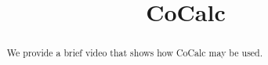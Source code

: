 \documentclass{ximera}
\title{CoCalc}
\begin{document}
  
\begin{abstract}  
We provide a brief video that shows how CoCalc may be used.
\end{abstract}  
\maketitle
\end{document}
